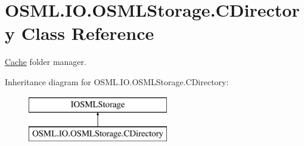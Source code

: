 \hypertarget{classOSML_1_1IO_1_1OSMLStorage_1_1CDirectory}{}\section{O\+S\+M\+L.\+I\+O.\+O\+S\+M\+L\+Storage.\+C\+Directory Class Reference}
\label{classOSML_1_1IO_1_1OSMLStorage_1_1CDirectory}


\mbox{\hyperlink{namespaceOSML_1_1Cache}{Cache}} folder manager.  


Inheritance diagram for O\+S\+M\+L.\+I\+O.\+O\+S\+M\+L\+Storage.\+C\+Directory\+:\begin{figure}[H]
\begin{center}
\leavevmode
\includegraphics[height=2.000000cm]{classOSML_1_1IO_1_1OSMLStorage_1_1CDirectory}
\end{center}
\end{figure}
